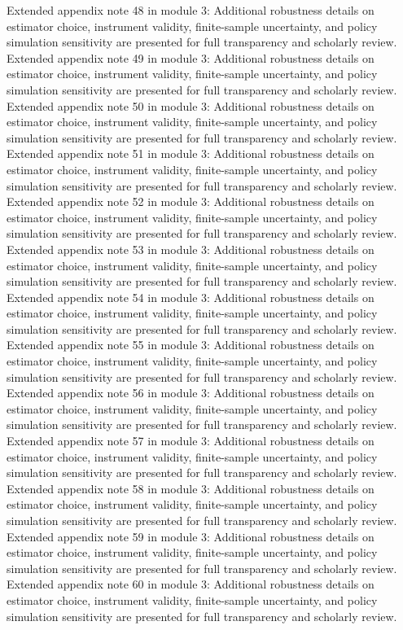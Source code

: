 \documentclass[preprint,12pt]{elsarticle}
\begin{document}
Extended appendix note 48 in module 3: Additional robustness details on estimator choice, instrument validity, finite-sample uncertainty, and policy simulation sensitivity are presented for full transparency and scholarly review.
Extended appendix note 49 in module 3: Additional robustness details on estimator choice, instrument validity, finite-sample uncertainty, and policy simulation sensitivity are presented for full transparency and scholarly review.
Extended appendix note 50 in module 3: Additional robustness details on estimator choice, instrument validity, finite-sample uncertainty, and policy simulation sensitivity are presented for full transparency and scholarly review.
Extended appendix note 51 in module 3: Additional robustness details on estimator choice, instrument validity, finite-sample uncertainty, and policy simulation sensitivity are presented for full transparency and scholarly review.
Extended appendix note 52 in module 3: Additional robustness details on estimator choice, instrument validity, finite-sample uncertainty, and policy simulation sensitivity are presented for full transparency and scholarly review.
Extended appendix note 53 in module 3: Additional robustness details on estimator choice, instrument validity, finite-sample uncertainty, and policy simulation sensitivity are presented for full transparency and scholarly review.
Extended appendix note 54 in module 3: Additional robustness details on estimator choice, instrument validity, finite-sample uncertainty, and policy simulation sensitivity are presented for full transparency and scholarly review.
Extended appendix note 55 in module 3: Additional robustness details on estimator choice, instrument validity, finite-sample uncertainty, and policy simulation sensitivity are presented for full transparency and scholarly review.
Extended appendix note 56 in module 3: Additional robustness details on estimator choice, instrument validity, finite-sample uncertainty, and policy simulation sensitivity are presented for full transparency and scholarly review.
Extended appendix note 57 in module 3: Additional robustness details on estimator choice, instrument validity, finite-sample uncertainty, and policy simulation sensitivity are presented for full transparency and scholarly review.
Extended appendix note 58 in module 3: Additional robustness details on estimator choice, instrument validity, finite-sample uncertainty, and policy simulation sensitivity are presented for full transparency and scholarly review.
Extended appendix note 59 in module 3: Additional robustness details on estimator choice, instrument validity, finite-sample uncertainty, and policy simulation sensitivity are presented for full transparency and scholarly review.
Extended appendix note 60 in module 3: Additional robustness details on estimator choice, instrument validity, finite-sample uncertainty, and policy simulation sensitivity are presented for full transparency and scholarly review.
\end{document}
